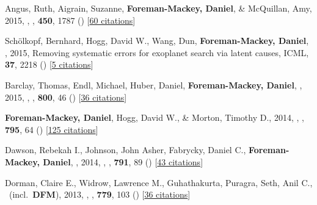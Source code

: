 \item[{\color{numcolor}\scriptsize9}] Angus, Ruth, Aigrain, Suzanne, \textbf{Foreman-Mackey, Daniel}, \& McQuillan, Amy, 2015, , \mnras, \textbf{450}, 1787 () [\href{http://adsabs.harvard.edu/abs/2015MNRAS.450.1787A}{60 citations}]

\item[{\color{numcolor}\scriptsize8}] Sch{\"o}lkopf, Bernhard, Hogg, David W., Wang, Dun, \textbf{Foreman-Mackey, Daniel}, \etal, 2015, Removing systematic errors for exoplanet search via latent causes, ICML, \textbf{37}, 2218 () [\href{https://scholar.google.com/scholar?cites=11768165421845046384}{5 citations}]

\item[{\color{numcolor}\scriptsize7}] Barclay, Thomas, Endl, Michael, Huber, Daniel, \textbf{Foreman-Mackey, Daniel}, \etal, 2015, , \apj, \textbf{800}, 46 () [\href{http://adsabs.harvard.edu/abs/2015ApJ...800...46B}{36 citations}]

\item[{\color{numcolor}\scriptsize6}] \textbf{Foreman-Mackey, Daniel}, Hogg, David W., \& Morton, Timothy D., 2014, , \apj, \textbf{795}, 64 () [\href{http://adsabs.harvard.edu/abs/2014ApJ...795...64F}{125 citations}]

\item[{\color{numcolor}\scriptsize5}] Dawson, Rebekah I., Johnson, John Asher, Fabrycky, Daniel C., \textbf{Foreman-Mackey, Daniel}, \etal, 2014, , \apj, \textbf{791}, 89 () [\href{http://adsabs.harvard.edu/abs/2014ApJ...791...89D}{43 citations}]

\item[{\color{numcolor}\scriptsize4}] Dorman, Claire E., Widrow, Lawrence M., Guhathakurta, Puragra, Seth, Anil C., \etal\ (incl.\ \textbf{DFM}), 2013, , \apj, \textbf{779}, 103 () [\href{http://adsabs.harvard.edu/abs/2013ApJ...779..103D}{36 citations}]

